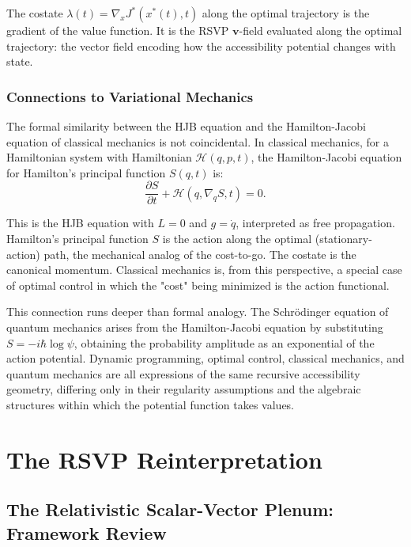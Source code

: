 \documentclass[12pt, a4paper, openany]{book}
\theoremstyle{plain}
\theoremstyle{definition}
\theoremstyle{remark}
\newcommand{\vvec}{\mathbf{v}}
\begin{document}
The costate $\lambda(t) = \nabla_x J^*(x^*(t), t)$ along the optimal trajectory is the gradient of the value function. It is the RSVP $\vvec$-field evaluated along the optimal trajectory: the vector field encoding how the accessibility potential changes with state.

\section{Connections to Variational Mechanics}

The formal similarity between the HJB equation and the Hamilton-Jacobi equation of classical mechanics is not coincidental. In classical mechanics, for a Hamiltonian system with Hamiltonian $\mathcal{H}(q,p,t)$, the Hamilton-Jacobi equation for Hamilton's principal function $S(q,t)$ is:
\[
\frac{\partial S}{\partial t} + \mathcal{H}\!\left(q, \nabla_q S, t\right) = 0.
\]

This is the HJB equation with $L = 0$ and $g = \dot{q}$, interpreted as free propagation. Hamilton's principal function $S$ is the action along the optimal (stationary-action) path, the mechanical analog of the cost-to-go. The costate is the canonical momentum. Classical mechanics is, from this perspective, a special case of optimal control in which the "cost" being minimized is the action functional.

This connection runs deeper than formal analogy. The Schrödinger equation of quantum mechanics arises from the Hamilton-Jacobi equation by substituting $S = -i\hbar \log \psi$, obtaining the probability amplitude as an exponential of the action potential. Dynamic programming, optimal control, classical mechanics, and quantum mechanics are all expressions of the same recursive accessibility geometry, differing only in their regularity assumptions and the algebraic structures within which the potential function takes values.

\part{The RSVP Reinterpretation}

\chapter{The Relativistic Scalar-Vector Plenum: Framework Review}
\end{document}
